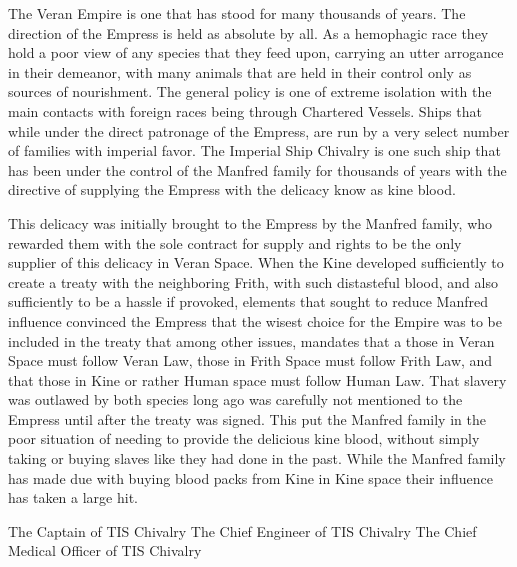 \documentclass[blue]{guildcamp4}
\begin{document}
\name{\bVer{}}

The Veran Empire is one that has stood for many thousands of years. The direction of the Empress is held as absolute by all. As a hemophagic race they hold a poor view of any species that they feed upon, carrying an utter arrogance in their demeanor, with many animals that are held in their control only as sources of nourishment. The general policy is one of extreme isolation with the main contacts with foreign races being through Chartered Vessels. Ships that while under the direct patronage of the Empress, are run by a very select number of families with imperial favor. The Imperial Ship Chivalry is one such ship that has been under the control of the Manfred family for thousands of years with the directive of supplying the Empress with the delicacy know as kine blood. 

This delicacy was initially brought to the Empress by the Manfred family, who rewarded them with the sole contract for supply and rights to be the only supplier of this delicacy in Veran Space. When the Kine developed sufficiently to create a treaty with the neighboring Frith, with such distasteful blood, and also sufficiently to be a hassle if provoked, elements that sought to reduce Manfred influence convinced the Empress that the wisest choice for the Empire was to be included in the treaty that among other issues, mandates that a those in Veran Space must follow Veran Law, those in Frith Space must follow Frith Law, and that those in Kine or rather Human space must follow Human Law. That slavery was outlawed by both species long ago was carefully not mentioned to the Empress until after the treaty was signed. This put the Manfred family in the poor situation of needing to provide the delicious kine blood, without simply taking or buying slaves like they had done in the past. While the Manfred family has made due with buying blood packs from Kine in Kine space their influence has taken a large hit.






\begin{members}
	\member{\cVone{}} The Captain of TIS Chivalry
	\member{\cVtwo{}} The Chief Engineer of TIS Chivalry
	\member{\cVthree{}} The Chief Medical Officer of TIS Chivalry

\end{members}
\end{document}

